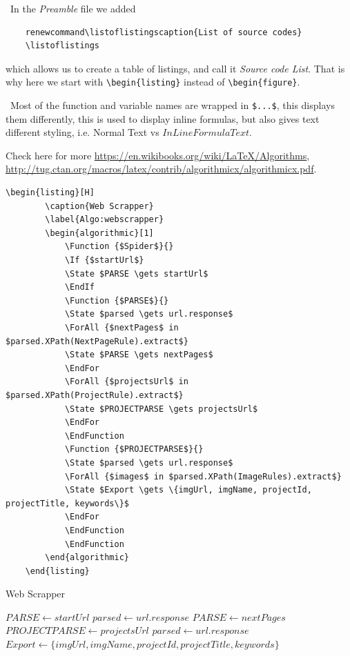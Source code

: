 \faWarning\, In the \emph{Preamble} file we added
\begin{verbatim}
    renewcommand\listoflistingscaption{List of source codes}
    \listoflistings
\end{verbatim}
which allows us to create a table of listings, and call it \emph{Source code List}. That is why here we start with \verb=\begin{listing}= instead  of \verb=\begin{figure}=.

\faWarning\, Most of the function and variable names are wrapped in \verb=$...$=, this displays them differently, this is used to display inline formulas, but also gives text different styling, i.e. Normal Text vs $In Line Formula Text$.

Check here for more \url{https://en.wikibooks.org/wiki/LaTeX/Algorithms}, \url{http://tug.ctan.org/macros/latex/contrib/algorithmicx/algorithmicx.pdf}.

\begin{Verbatim}[fontsize=\relsize{-1.5}]
    \begin{listing}[H]
        \caption{Web Scrapper}
        \label{Algo:webscrapper}
        \begin{algorithmic}[1]
            \Function {$Spider$}{}
            \If {$startUrl$}
            \State $PARSE \gets startUrl$
            \EndIf
            \Function {$PARSE$}{}
            \State $parsed \gets url.response$
            \ForAll {$nextPages$ in $parsed.XPath(NextPageRule).extract$}
            \State $PARSE \gets nextPages$
            \EndFor
            \ForAll {$projectsUrl$ in $parsed.XPath(ProjectRule).extract$}
            \State $PROJECTPARSE \gets projectsUrl$
            \EndFor
            \EndFunction
            \Function {$PROJECTPARSE$}{}
            \State $parsed \gets url.response$
            \ForAll {$images$ in $parsed.XPath(ImageRules).extract$}
            \State $Export \gets \{imgUrl, imgName, projectId, projectTitle, keywords\}$
            \EndFor
            \EndFunction
            \EndFunction
        \end{algorithmic}
    \end{listing}
\end{Verbatim}
\begin{listing}[H]
    \caption{Web Scrapper}
    \label{Algo:webscrapper}
    \begin{algorithmic}[1]
        \State $PARSE \gets startUrl$
        \EndIf
        \State $parsed \gets url.response$
        \State $PARSE \gets nextPages$
        \EndFor
        \State $PROJECTPARSE \gets projectsUrl$
        \EndFor
        \EndFunction
        \State $parsed \gets url.response$
        \State $Export \gets \{imgUrl, imgName, projectId, projectTitle, keywords\}$
        \EndFor
        \EndFunction
        \EndFunction
    \end{algorithmic}
\end{listing}


